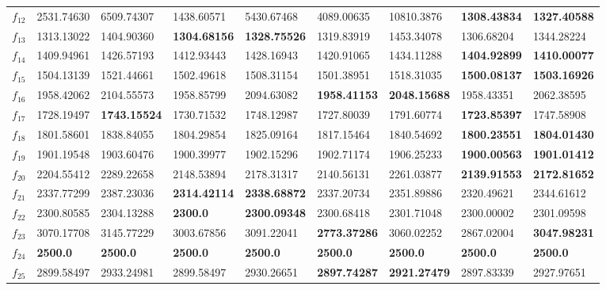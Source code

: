 \begin{table*}[t!]
{\begin{tabular}{|p{0.8cm}|p{1.6cm}|p{1.6cm}|p{1.6cm}|p{1.6cm}|p{1.6cm}|p{1.6cm}|p{1.6cm}|p{1.6cm}|}
$f_{12}$  & 2531.74630 & 6509.74307 & 1438.60571 & 5430.67468 & 4089.00635 & 10810.3876 & \textbf{1308.43834} & \textbf{1327.40588} \\ 
$f_{13}$ & 1313.13022 & 1404.90360 & \textbf{1304.68156} & \textbf{1328.75526} & 1319.83919 & 1453.34078 & 1306.68204 & 1344.28224 \\ 
$f_{14}$  & 1409.94961 & 1426.57193 & 1412.93443 & 1428.16943 & 1420.91065 & 1434.11288 & \textbf{1404.92899} & \textbf{1410.00077} \\ 
$f_{15}$  & 1504.13139 & 1521.44661 & 1502.49618 & 1508.31154 & 1501.38951 & 1518.31035 & \textbf{1500.08137} & \textbf{1503.16926} \\ 
$f_{16}$  & 1958.42062 & 2104.55573 & 1958.85799 & 2094.63082 & \textbf{1958.41153} & \textbf{2048.15688} & 1958.43351 & 2062.38595 \\ 
$f_{17}$  & 1728.19497 & \textbf{1743.15524} & 1730.71532 & 1748.12987 & 1727.80039 & 1791.60774 & \textbf{1723.85397} & 1747.58908 \\ 
$f_{18}$  & 1801.58601 & 1838.84055 & 1804.29854 & 1825.09164 & 1817.15464 & 1840.54692 & \textbf{1800.23551} & \textbf{1804.01430} \\ 
$f_{19}$  & 1901.19548 & 1903.60476 & 1900.39977 & 1902.15296 & 1902.71174 & 1906.25233 & \textbf{1900.00563} & \textbf{1901.01412} \\ 
$f_{20}$  & 2204.55412 & 2289.22658 & 2148.53894 & 2178.31317 & 2140.56131 & 2261.03877 & \textbf{2139.91553} & \textbf{2172.81652} \\ 
$f_{21}$  & 2337.77299 & 2387.23036 & \textbf{2314.42114} & \textbf{2338.68872} & 2337.20734 & 2351.89886 & 2320.49621 & 2344.61612 \\ 
$f_{22}$  & 2300.80585 & 2304.13288 & \textbf{2300.0} & \textbf{2300.09348} & 2300.68418 & 2301.71048 & 2300.00002 & 2301.09598 \\ 
$f_{23}$  & 3070.17708 & 3145.77229 & 3003.67856 & 3091.22041 & \textbf{2773.37286} & 3060.02252 & 2867.02004 & \textbf{3047.98231} \\ 
$f_{24}$  & \textbf{2500.0} & \textbf{2500.0} & \textbf{2500.0} & \textbf{2500.0} & \textbf{2500.0} & \textbf{2500.0} & \textbf{2500.0} & \textbf{2500.0} \\ 
$f_{25}$  & 2899.58497 & 2933.24981 & 2899.58497 & 2930.26651 & \textbf{2897.74287} & \textbf{2921.27479} & 2897.83339 & 2927.97651 \\ 

\end{tabular}}
\end{table*}
